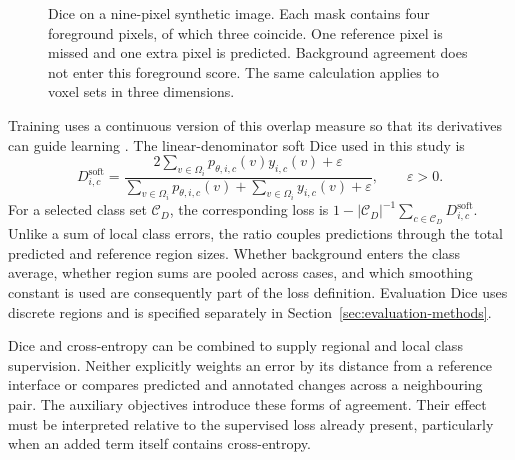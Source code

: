 \documentclass[12pt,a4paper]{article}
\begin{document}
\begin{figure}[htbp]
\caption{Dice on a nine-pixel synthetic image. Each mask contains four foreground pixels, of which three coincide. One reference pixel is missed and one extra pixel is predicted. Background agreement does not enter this foreground score. The same calculation applies to voxel sets in three dimensions.}
\label{fig:dice-example}
\end{figure}

Training uses a continuous version of this overlap measure so that its
derivatives can guide learning \cite{milletari2016vnet}. The
linear-denominator soft Dice used in this study is
\begin{equation}
D_{i,c}^{\mathrm{soft}}=
\frac{2\sum_{v\in\Omega_i}p_{\theta,i,c}(v)y_{i,c}(v)+\varepsilon}
     {\sum_{v\in\Omega_i}p_{\theta,i,c}(v)
      +\sum_{v\in\Omega_i}y_{i,c}(v)+\varepsilon},
\qquad \varepsilon>0.
\label{eq:soft-dice}
\end{equation}
For a selected class set $\mathcal C_D$, the corresponding loss is
$1-|\mathcal C_D|^{-1}\sum_{c\in\mathcal C_D}D^{\mathrm{soft}}_{i,c}$.
Unlike a sum of local class errors, the ratio couples predictions through
the total predicted and reference region sizes. Whether background enters
the class average, whether region sums are pooled across cases, and which
smoothing constant is used are consequently part of the loss definition.
Evaluation Dice uses discrete regions and is specified separately in
Section~\ref{sec:evaluation-methods}.

Dice and cross-entropy can be combined to supply regional and local class
supervision. Neither explicitly weights an error by its distance from a
reference interface or compares predicted and annotated changes across
a neighbouring pair. The auxiliary objectives introduce these forms of
agreement. Their effect must be interpreted relative to the supervised
loss already present, particularly when an added term itself contains
cross-entropy.
\end{document}
